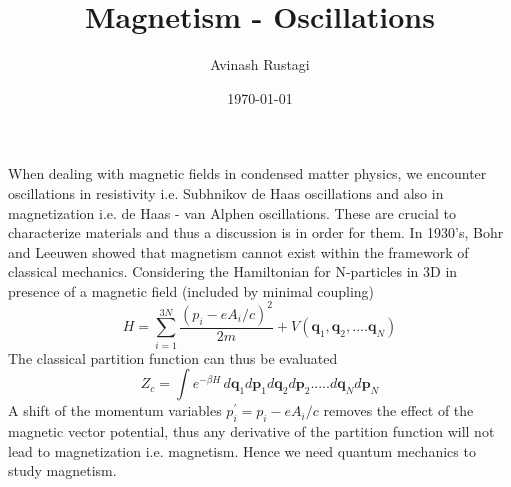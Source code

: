 \documentclass[aps,prb,onecolumn,notitlepage,showpacs,floatfix,superscriptaddress]{revtex4-1}
\begin{document}
\title{Magnetism - Oscillations}

\author{Avinash Rustagi}
%
\date{\today}

\maketitle

When dealing with magnetic fields in condensed matter physics, we encounter oscillations in resistivity i.e. Subhnikov de Haas oscillations and also in magnetization i.e. de Haas - van Alphen oscillations. These are crucial to characterize materials and thus a discussion is in order for them. In 1930's, Bohr and Leeuwen showed that magnetism cannot exist within the framework of classical mechanics. Considering the Hamiltonian for N-particles in 3D in presence of a magnetic field (included by minimal coupling)
\begin{equation}
H=\sum_{i=1}^{3N} \dfrac{(p_i-e A_i /c)^2}{2m} + V({\bm q}_1,{\bm q}_2,....{\bm q}_N)
\end{equation} 
The classical partition function can thus be evaluated 
\begin{equation}
Z_c = \int e^{-\beta H} \, d{\bm q}_1 d{\bm p}_1 d{\bm q}_2 d{\bm p}_2 ..... d{\bm q}_N d{\bm p}_N
\end{equation}
A shift of the momentum variables $p^\prime_i = p_i -e A_i/c$ removes the effect of the magnetic vector potential, thus any derivative of the partition function will not lead to magnetization i.e. magnetism. Hence we need quantum mechanics to study magnetism.
\end{document}
